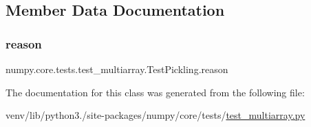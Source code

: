 \subsection{Member Data Documentation}
\mbox{\label{classnumpy_1_1core_1_1tests_1_1test__multiarray_1_1TestPickling_a6fe3f5b68c7eddea7bf821f177faf082}} 
\subsubsection{\texorpdfstring{reason}{reason}}
{\footnotesize\ttfamily numpy.\+core.\+tests.\+test\+\_\+multiarray.\+Test\+Pickling.\+reason\hspace{0.3cm}{\ttfamily [static]}}



The documentation for this class was generated from the following file\+:\begin{DoxyCompactItemize}
\item 
venv/lib/python3./site-\/packages/numpy/core/tests/\hyperlink{core_2tests_2test__multiarray_8py}{test\+\_\+multiarray.\+py}\end{DoxyCompactItemize}
